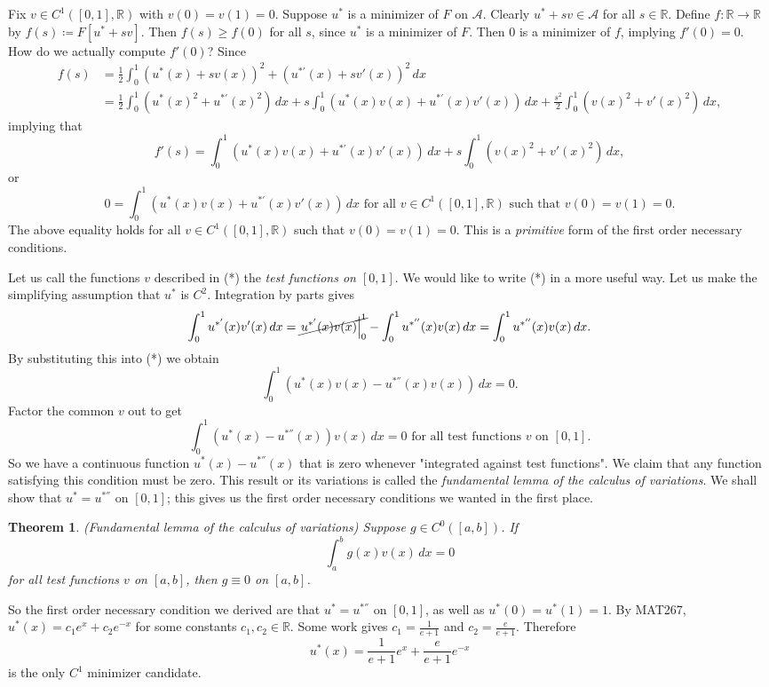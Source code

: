 \documentclass[11pt]{article}
\newcommand{\R}{\mathbb{R}}
\newtheorem{theorem}{Theorem}[subsection]
\begin{document}
Fix $v \in C^1([0,1],\R)$ with $v(0) = v(1) = 0$. Suppose $u^*$ is a minimizer of $F$ on $\mathcal{A}$. Clearly $u^* + sv \in \mathcal{A}$ for all $s \in \R$. Define $f : \R \to \R$ by $f(s) \coloneqq F[u^* + sv]$. Then $f(s) \geq f(0)$ for all $s$, since $u^*$ is a minimizer of $F$. Then $0$ is a minimizer of $f$, implying $f'(0) = 0$. How do we actually compute $f'(0)$? Since
\begin{align*}
f(s) &= \frac{1}{2} \int_0^1 (u^*(x) + sv(x))^2 + (u^{*'}(x) + sv'(x))^2 \, dx \\
&= \frac{1}{2} \int_0^1 (u^*(x)^2 + u^{*'}(x)^2) \, dx + s\int_0^1 ( u^*(x)v(x) + u^{*'}(x)v'(x) ) \, dx + \frac{s^2}{2} \int_0^1 (v(x)^2 + v'(x)^2) \, dx,
\end{align*}
implying that
\[
f'(s) = \int_0^1 ( u^*(x)v(x) + u^{*'}(x)v'(x) ) \, dx + s\int_0^1 (v(x)^2 + v'(x)^2) \, dx,
\]
or
\[
\tag{*}
0 = \int_0^1 ( u^*(x)v(x) + u^{*'}(x)v'(x) ) \, dx \text{ for all } v \in C^1([0,1], \R) \text{ such that } v(0)=v(1)=0.
\]
The above equality holds for all $v \in C^1([0,1], \R)$ such that $v(0)=v(1)=0$. This is a \emph{primitive} form of the first order necessary conditions.

Let us call the functions $v$ described in (*) the \emph{test functions on $[0,1]$}. We would like to write (*) in a more useful way. Let us make the simplifying assumption that $u^*$ is $C^2$. Integration by parts gives
\[
\int_0^1 u^{*'}(x)v'(x) \, dx = \cancel{\left. u^{*'}(x)v(x) \right|_0^1} - \int_0^1 u^{*''}(x) v(x) \, dx = \int_0^1 u^{*''}(x) v(x) \, dx.
\]
By substituting this into (*) we obtain
\[
\int_0^1 (u^*(x)v(x) - u^{*''}(x)v(x))\, dx = 0.
\]
Factor the common $v$ out to get
\[
\int_0^1 (u^*(x) - u^{*''}(x))v(x) \, dx = 0 \text{ for all test functions } v \text{ on } [0,1].
\]
So we have a continuous function $u^*(x) - u^{*''}(x)$ that is zero whenever "integrated against test functions". We claim that any function satisfying this condition must be zero. This result or its variations is called the \emph{fundamental lemma of the calculus of variations}. We shall show that $u^* = u^{*''}$ on $[0,1]$; this gives us the first order necessary conditions we wanted in the first place.

\begin{theorem}
(Fundamental lemma of the calculus of variations) Suppose $g \in C^0([a,b])$. If
\[
\int_a^b g(x)v(x) \, dx = 0
\]
for all test functions $v$ on $[a,b]$, then $g \equiv 0$ on $[a,b]$.
\end{theorem}

So the first order necessary condition we derived are that $u^* = u^{*''}$ on $[0,1]$, as well as $u^*(0) = u^*(1) = 1$. By MAT267, $u^*(x) = c_1e^x + c_2e^{-x}$ for some constants $c_1, c_2 \in \R$. Some work gives $c_1 = \frac{1}{e+1}$ and $c_2 = \frac{e}{e + 1}$. Therefore
\[
u^*(x) = \frac{1}{e+1}e^x + \frac{e}{e+1}e^{-x}
\]
is the only $C^1$ minimizer candidate.
\end{document}
